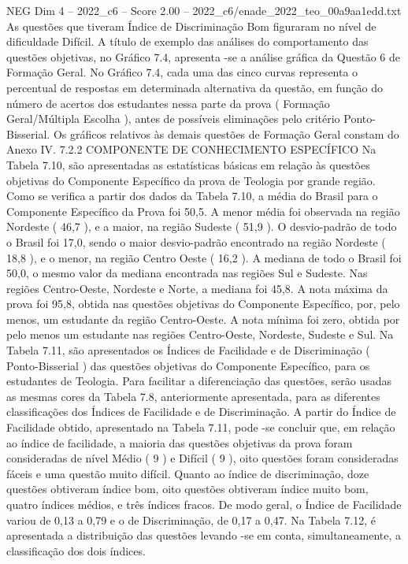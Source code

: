 \begin{textsample}{NEG Dim 4 – 2022\_c6 – Score 2.00 – 2022\_c6/enade\_2022\_teo\_00a9aa1edd.txt}
As questões que tiveram Índice de Discriminação Bom figuraram no nível de dificuldade Difícil.
A título de exemplo das análises do comportamento das questões objetivas, no Gráfico 7.4, apresenta -se a análise gráfica da Questão 6 de Formação Geral.
No Gráfico 7.4, cada uma das cinco curvas representa o percentual de respostas em determinada alternativa da questão, em função do número de acertos dos estudantes nessa parte da prova ( Formação Geral/Múltipla Escolha ), antes de possíveis eliminações pelo critério Ponto-Bisserial.
Os gráficos relativos às demais questões de Formação Geral constam do Anexo IV. 7.2.2 COMPONENTE DE CONHECIMENTO ESPECÍFICO Na Tabela 7.10, são apresentadas as estatísticas básicas em relação às questões objetivas do Componente Específico da prova de Teologia por grande região.
Como se verifica a partir dos dados da Tabela 7.10, a média do Brasil para o Componente Específico da Prova foi 50,5.
A menor média foi observada na região Nordeste ( 46,7 ), e a maior, na região Sudeste ( 51,9 ).
O desvio-padrão de todo o Brasil foi 17,0, sendo o maior desvio-padrão encontrado na região Nordeste ( 18,8 ), e o menor, na região Centro Oeste ( 16,2 ).
A mediana de todo o Brasil foi 50,0, o mesmo valor da mediana encontrada nas regiões Sul e Sudeste.
Nas regiões Centro-Oeste, Nordeste e Norte, a mediana foi 45,8.
A nota máxima da prova foi 95,8, obtida nas questões objetivas do Componente Específico, por, pelo menos, um estudante da região Centro-Oeste.
A nota mínima foi zero, obtida por pelo menos um estudante nas regiões Centro-Oeste, Nordeste, Sudeste e Sul.
Na Tabela 7.11, são apresentados os Índices de Facilidade e de Discriminação ( Ponto-Bisserial ) das questões objetivas do Componente Específico, para os estudantes de Teologia.
Para facilitar a diferenciação das questões, serão usadas as mesmas cores da Tabela 7.8, anteriormente apresentada, para as diferentes classificações dos Índices de Facilidade e de Discriminação.
A partir do Índice de Facilidade obtido, apresentado na Tabela 7.11, pode -se concluir que, em relação ao índice de facilidade, a maioria das questões objetivas da prova foram consideradas de nível Médio ( 9 ) e Difícil ( 9 ), oito questões foram consideradas fáceis e uma questão muito difícil.
Quanto ao índice de discriminação, doze questões obtiveram índice bom, oito questões obtiveram índice muito bom, quatro índices médios, e três índices fracos.
De modo geral, o Índice de Facilidade variou de 0,13 a 0,79 e o de Discriminação, de 0,17 a 0,47.
Na Tabela 7.12, é apresentada a distribuição das questões levando -se em conta, simultaneamente, a classificação dos dois índices.

\end{textsample}
